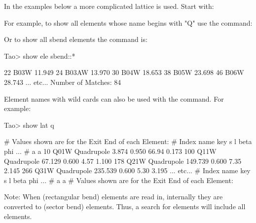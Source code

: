 \documentclass{hitec}     %
\begin{document}
In the examples below a more complicated lattice is used. Start \tao with:
For example, to show all elements whose name begins with "Q" use the  command:

Or to show all sbend elements the command is:
\begin{code}  
Tao> show ele sbend::*

        22  B03W                                            11.949
        24  B03AW                                           13.970
        30  B04W                                            18.653
        38  B05W                                            23.698
        46  B06W                                            28.743
... etc...
Number of Matches: 84
\end{code}

Element names with wild cards can also be used with the  command. For example:
\begin{code}
Tao> show lat q%

# Values shown are for the Exit End of each Element:
# Index  name   key                   s       l    beta     phi ...  
#                                                     a       a
    10  Q01W Quadrupole            3.874   0.950   66.94   0.173  
   100  Q11W Quadrupole           67.129   0.600    4.57   1.100  
   178  Q21W Quadrupole          149.739   0.600    7.35   2.145  
   266  Q31W Quadrupole          235.539   0.600    5.30   3.195  
   ... etc...
# Index  name   key                   s       l    beta     phi ...  
#                                                     a       a
# Values shown are for the Exit End of each Element:
\end{code}

Note: When  (rectangular bend) elements are read in, internally they are converted to
 (sector bend) elements. Thus, a search for  elements will include all
 elements.
\end{document}
